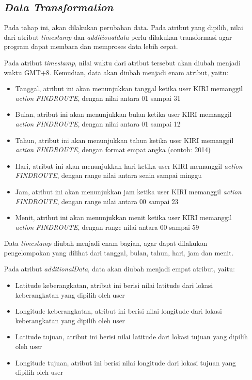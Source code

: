 \subsection{\textsl{Data Transformation}}
Pada tahap ini, akan dilakukan perubahan data. Pada atribut yang dipilih, nilai dari atribut \textsl{timestamp} dan \textsl{additionaldata} perlu dilakukan transformasi agar program dapat membaca dan memproses data lebih cepat. 

Pada atribut \textsl{timestamp}, nilai waktu dari atribut tersebut akan diubah menjadi waktu GMT+8. Kemudian, data akan diubah menjadi enam atribut, yaitu:
\begin{itemize}
	\item Tanggal, atribut ini akan menunjukkan tanggal ketika user KIRI memanggil \textsl{action FINDROUTE}, dengan nilai antara 01 sampai 31
	\item Bulan, atribut ini akan menunjukkan bulan ketika user KIRI memanggil \textsl{action FINDROUTE}, dengan nilai antara 01 sampai 12 
	\item Tahun, atribut ini akan menunjukkan tahun ketika user KIRI memanggil \textsl{action FINDROUTE}, dengan format empat angka (contoh: 2014)
	\item Hari, atribut ini akan menunjukkan hari ketika user KIRI memanggil \textsl{action FINDROUTE}, dengan range nilai antara senin sampai minggu
	\item Jam, atribut ini akan menunjukkan jam ketika user KIRI memanggil \textsl{action FINDROUTE}, dengan range nilai antara 00 sampai 23
	\item Menit, atribut ini akan menunjukkan menit ketika user KIRI memanggil \textsl{action FINDROUTE}, dengan range nilai antara 00 sampai 59
\end{itemize}

Data \textsl{timestamp} diubah menjadi enam bagian, agar dapat dilakukan pengelompokan yang dilihat dari tanggal, bulan, tahun, hari, jam dan menit.

Pada atribut \textsl{additionalData}, data akan diubah menjadi empat atribut, yaitu:
\begin{itemize}
	\item Latitude keberangkatan, atribut ini berisi nilai latitude dari lokasi keberangkatan yang dipilih oleh user
	\item Longitude keberangkatan, atribut ini berisi nilai longitude dari lokasi keberangkatan yang dipilih oleh user
	\item Latitude tujuan, atribut ini berisi nilai latitude dari lokasi tujuan yang dipilih oleh user
	\item Longitude tujuan, atribut ini berisi nilai longitude dari lokasi tujuan yang dipilih oleh user
\end{itemize}

